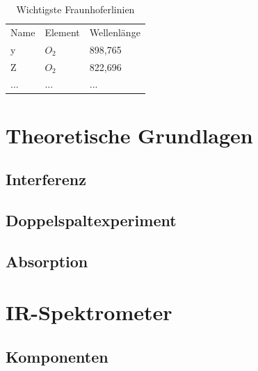 \documentclass{article}
\begin{document}
\begin{table}[H]
    \centering
    \label{tab:wichtige-fraunhoferlinien}
    \begin{tabular}{l|l|l}
        Name & Element & Wellenlänge \\
        y    & $O_2$    & 898,765    \\
        Z    & $O_2$    & 822,696    \\
        ...  & ...      & ...
    \end{tabular}
    \caption{Wichtigste Fraunhoferlinien}
\end{table}







\newpage
\section{Theoretische Grundlagen}


\subsection{Interferenz}


\subsection{Doppelspaltexperiment}


\subsection{Absorption}


\section{IR-Spektrometer}


\subsection{Komponenten}
\end{document}
